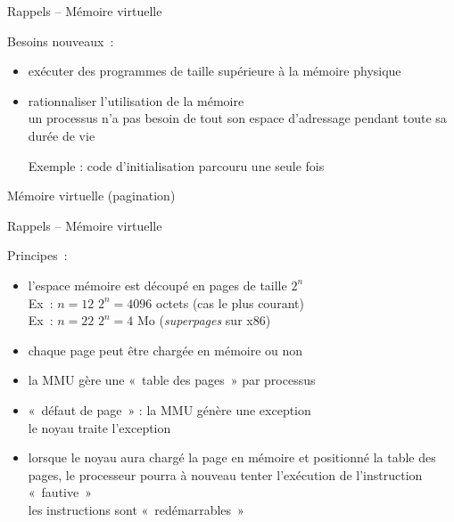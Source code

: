 \begin {frame} {Rappels -- Mémoire virtuelle}

    Besoins nouveaux~:
    \begin {itemize}
	\item exécuter des programmes de taille supérieure à la
	    mémoire physique

	\item rationnaliser l'utilisation de la mémoire \\
	    un processus n'a pas besoin de tout son espace d'adressage
	    pendant toute sa durée de vie

	    Exemple : code d'initialisation parcouru une seule
	    fois
    \end {itemize}

    \vspace* {3mm}

    \implique Mémoire virtuelle (pagination)

\end {frame}

\begin {frame} {Rappels -- Mémoire virtuelle}

    Principes~:

    \begin {itemize}
	\item l'espace mémoire est découpé en pages de taille $2^n$ \\
	    Ex~: $n = 12$ \implique $2^n = 4096$ octets (cas le plus courant) \\
	    Ex~: $n = 22$ \implique $2^n = 4$ Mo (\emph {superpages}
		sur x86)

	\item chaque page peut être chargée en mémoire ou non

	\item la MMU gère une «~table des pages~» par processus

	\item «~défaut de page~» : la MMU génère une exception \\
	    \implique le noyau traite l'exception
	
	\item lorsque le noyau aura chargé la page en mémoire et
	    positionné la table des pages, le processeur pourra à
	    nouveau tenter l'exécution de l'instruction «~fautive~»
	    \\
	    \implique les instructions sont «~redémarrables~»

    \end {itemize}

\end {frame}

